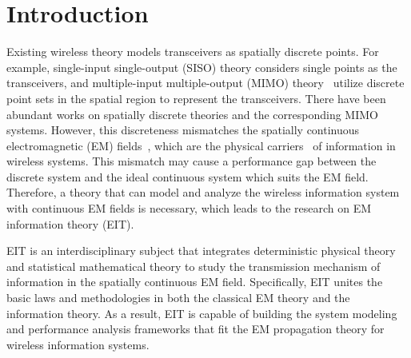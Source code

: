 \documentclass[journal,twocolumn]{IEEEtran}
\begin{document}
\section{Introduction}
Existing wireless theory models transceivers as spatially discrete points. For example, single-input single-output (SISO) theory considers single points as the transceivers, and multiple-input multiple-output (MIMO) theory~\cite{goldsmith2003capacity} utilize discrete point sets in the spatial region to represent the transceivers. 
There have been abundant works on spatially discrete theories and the corresponding MIMO systems. 
However, this discreteness mismatches the spatially continuous electromagnetic (EM) fields~\cite{huang2020holographic}, which are the physical carriers~\cite{migliore2018horse} of information in wireless systems. 
This mismatch may cause a performance gap between the discrete system and the ideal continuous system which suits the EM field. 
Therefore, a theory that can model and analyze the wireless information system with continuous EM fields is necessary, which leads to the research on EM information theory (EIT).

EIT is an interdisciplinary subject that integrates deterministic physical theory and statistical mathematical theory to study the transmission mechanism of information in the spatially continuous EM field. 
Specifically, EIT unites the basic laws and methodologies in both the classical EM theory and the information theory. 
As a result, EIT is capable of building the system modeling and performance analysis frameworks that fit the EM propagation theory for wireless information systems. 
\end{document}
